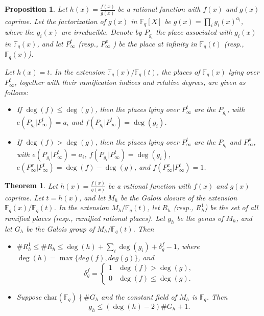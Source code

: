 \documentclass[10pt,a4paper]{amsart}
\newtheorem{proposition}{Proposition}
\newtheorem{theorem}{Theorem}
\begin{document}
\begin{proposition}\label{infi}
Let $h(x)=\displaystyle\frac{f(x)}{g(x)}$ be a rational function with $f(x)$ and $g(x)$ coprime. Let the factorization of $g(x)$ in $\mathbb{F}_{q}\left [ X \right ] $ be $g(x)=\displaystyle\prod_{ i }g_{{i}}(x)^{a_{i}}$, where the $g_{i}(x)$ are irreducible. Denote by $P_{g_{i}}$ the place associated with $g_{i}(x)$ in $\mathbb{F}_{q}(x)$, and let $P_{\infty}^{t}$ (resp., $P_{\infty}^{x}$ ) be the place at infinity in $\mathbb{F}_{q}(t)$ (resp., $\mathbb{F}_{q}(x)$). 

Let $h(x)=t$. In the extension $\mathbb{F}_{q}(x)/\mathbb{F}_{q}(t)$, the places of $\mathbb{F}_{q}(x)$ lying over $P_{\infty}^{t}$, together with their ramification indices and relative degrees, are given as follows:

\begin{itemize}
\item[(i)] If $\deg(f)\le \deg(g)$, then the places lying over $P_{\infty}^{t}$ are the $P_{g_{i}}$, with $e(P_{g_{i}}|P_{\infty}^{t})=a_{i}$ and $f(P_{g_{i}}|P_{\infty}^{t})=\deg(g_{i})$.
\item[(ii)] If $\deg(f)>\deg(g)$, then the places lying over $P_{\infty}^{t}$ are the $P_{g_{i}}$ and $P_{\infty}^{x}$, with $e(P_{g_{i}}|P_{\infty}^{t})=a_{i}$, $f(P_{g_{i}}|P_{\infty}^{t})=\deg(g_{i})$, $e(P_{\infty}^{x}|P_{\infty}^{t})=\deg(f)-\deg(g)$, and $f(P_{\infty}^{x}|P_{\infty}^{t})=1$. 
\end{itemize} 
\end{proposition}

\begin{theorem} \label{21e}
Let $h(x)=\displaystyle\frac{f(x)}{g(x)}$ be a rational function with $f(x)$ and $g(x)$ coprime. Let $t=h(x)$, and let $M_{h}$ be the Galois closure of the extension $\mathbb{F}_q(x)/\mathbb{F}_q(t)$. In the extension $M_{h}/\mathbb{F}_q(t)$, let $R_{h}$ (resp., $R_{h}^{1}$) be the set of all ramified places (resp., ramified rational places). Let $g_{h}$ be the genus of $M_{h}$, and let $G_{h}$ be the Galois group of $M_{h}/\mathbb{F}_q(t)$. Then 

\begin{itemize}
\item[(i)] $\#R_{h}^{1}\le \#R_{h}\le \deg(h)+\displaystyle\sum_{i}\deg(g_{i})+\delta_{g}^{f}-1$, where $\deg(h)=\max\{deg(f), deg(g)  \}$, and
$$\delta_{g}^{f}=\begin{cases}
1 & \deg(f)>\deg(g), \\
0 & \deg(f)\le\deg(g).
\end{cases}$$

\item[(ii)] Suppose $\text{char}(\mathbb{F}_{q})\nmid \#G_{h}$ and the constant field of $M_{h}$ is $\mathbb{F}_{q}$. Then
$$g_{h}\le (\deg(h)-2)\#G_{h}+1.$$
\end{itemize}
\end{theorem}
\end{document}
